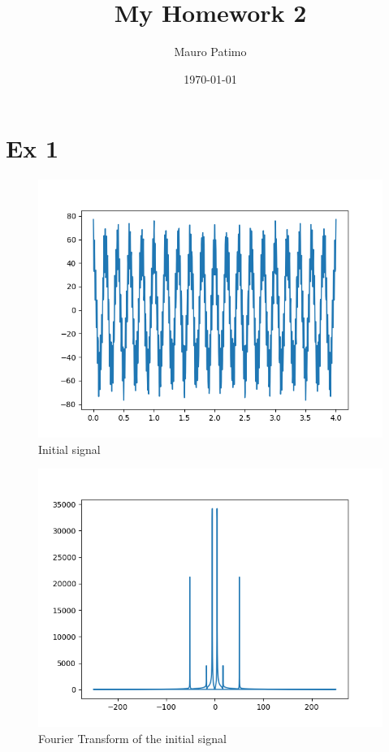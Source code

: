 \documentclass{article}
\begin{document}
\title{My Homework 2}
\author{Mauro Patimo}
\date{\today}

\maketitle

\section{Ex 1}
\begin{figure}[H]
    \includegraphics[width=\textwidth]{HW2_1.png}
    \caption{Initial signal}
\end{figure}
\begin{figure}[H]
    \includegraphics[width=\textwidth]{HW2_1frequency.png}
    \caption{Fourier Transform of the initial signal}
\end{figure}
\end{document}
